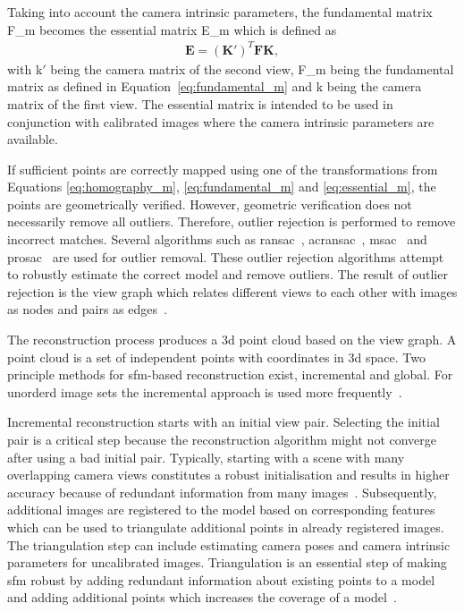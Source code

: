 Taking into account the camera intrinsic parameters, the fundamental matrix \gls{F_m} becomes the essential matrix \gls{E_m} which is defined as
\begin{align}
    \textbf{E} = (\textbf{K}')^{T}\textbf{F}\textbf{K}, \label{eq:essential_m}
\end{align}
with \gls{k}$'$ being the camera matrix of the second view, \gls{F_m} being the fundamental matrix as defined in Equation~\ref{eq:fundamental_m} and \gls{k} being the camera matrix of the first view. The essential matrix is intended to be used in conjunction with calibrated images where the camera intrinsic parameters are available.

If sufficient points are correctly mapped using one of the transformations from Equations \ref{eq:homography_m}, \ref{eq:fundamental_m} and \ref{eq:essential_m}, the points are geometrically verified. However, geometric verification does not necessarily remove all outliers. Therefore, outlier rejection is performed to remove incorrect matches. Several algorithms such as \gls{ransac}~\cite{Fischler1981RandomCartography}, \gls{acransac}~\cite{moisan2012automatic}, \gls{msac}~\cite{wang2009generalized} and \gls{prosac}~\cite{Chum2005MatchingConsensus} are used for outlier removal. These outlier rejection algorithms attempt to robustly estimate the correct model and remove outliers. The result of outlier rejection is the view graph which relates different views to each other with images as nodes and pairs as edges~\cite{schonberger2016structure}.

The reconstruction process produces a \gls{3d} point cloud based on the view graph. A point cloud is a set of independent points with coordinates in \gls{3d} space. Two principle methods for \gls{sfm}-based reconstruction exist, incremental and global. For unorderd image sets the incremental approach is used more frequently~\cite{schonberger2016structure}.

Incremental reconstruction starts with an initial view pair. Selecting the initial pair is a critical step because the reconstruction algorithm might not converge after using a bad initial pair. Typically, starting with a scene with many overlapping camera views constitutes a robust initialisation and results in higher accuracy because of redundant information from many images~\cite{schonberger2016structure}.
Subsequently, additional images are registered to the model based on corresponding features which can be used to triangulate additional points in already registered images. The triangulation step can include estimating camera poses and camera intrinsic parameters for uncalibrated images. Triangulation is an essential step of making \gls{sfm} robust by adding redundant information about existing points to a model and adding additional points which increases the coverage of a model~\cite{schonberger2016structure}.

